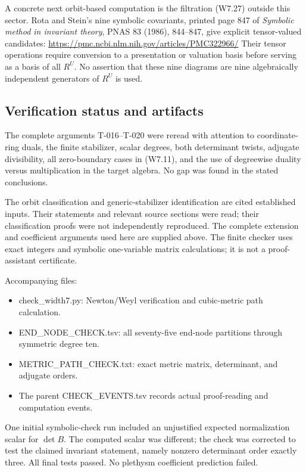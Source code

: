 \documentclass[
  10pt,
]{article}
\providecommand{\tightlist}{%
  \setlength{\itemsep}{0pt}\setlength{\parskip}{0pt}}
\providecommand{\tightlist}{\setlength{\itemsep}{0pt}\setlength{\parskip}{0pt}}
\begin{document}
A concrete next orbit-based computation is the filtration (W7.27)
outside this sector. Rota and Stein's nine symbolic covariants, printed
page 847 of \emph{Symbolic method in invariant theory}, PNAS 83 (1986),
844--847, give explicit tensor-valued candidates:
\url{https://pmc.ncbi.nlm.nih.gov/articles/PMC322966/} Their tensor
operations require conversion to a presentation or valuation basis
before serving as a basis of all \(R^U\). No assertion that these nine
diagrams are nine algebraically independent generators of \(R^U\) is
used.

\subsection{Verification status and
artifacts}\label{verification-status-and-artifacts}

The complete arguments T-016--T-020 were reread with attention to
coordinate-ring duals, the finite stabilizer, scalar degrees, both
determinant twists, adjugate divisibility, all zero-boundary cases in
(W7.11), and the use of degreewise duality versus multiplication in the
target algebra. No gap was found in the stated conclusions.

The orbit classification and generic-stabilizer identification are cited
established inputs. Their statements and relevant source sections were
read; their classification proofs were not independently reproduced. The
complete extension and coefficient arguments used here are supplied
above. The finite checker uses exact integers and symbolic one-variable
matrix calculations; it is not a proof-assistant certificate.

Accompanying files:

\begin{itemize}
\tightlist
\item
  check\_width7.py: Newton/Weyl verification and cubic-metric path
  calculation.
\item
  END\_NODE\_CHECK.tsv: all seventy-five end-node partitions through
  symmetric degree ten.
\item
  METRIC\_PATH\_CHECK.txt: exact metric matrix, determinant, and
  adjugate orders.
\item
  The parent CHECK\_EVENTS.tsv records actual proof-reading and
  computation events.
\end{itemize}

One initial symbolic-check run included an unjustified expected
normalization scalar for \(\det B\). The computed scalar was different;
the check was corrected to test the claimed invariant statement, namely
nonzero determinant order exactly three. All final tests passed. No
plethysm coefficient prediction failed.
\end{document}
